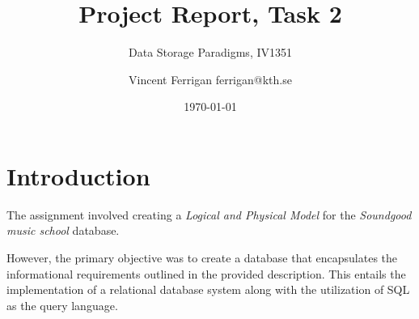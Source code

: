 \documentclass[a4paper]{scrartcl}
\title{Project Report, Task 2}
\subtitle{Data Storage Paradigms, IV1351}
\author{Vincent Ferrigan ferrigan@kth.se}
\date{\today}
\begin{document}
\maketitle
    







\section{Introduction}
The assignment involved creating a 
\emph{Logical and Physical Model} 
for the 
\emph{Soundgood music school} 
database. 

However, the primary objective was to create a database that encapsulates the
informational requirements outlined in the provided description. This entails
the implementation of a relational database system along with the utilization of
SQL as the query language.
\end{document}
